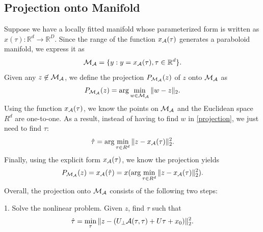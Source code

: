 \documentclass{article}
\theoremstyle{remark}
\begin{document}
\subsection{Projection onto Manifold}
Suppose we have a locally fitted manifold whose parameterized form is written as $x(\tau): {\mathbb R}^d\rightarrow {\mathbb R}^D$.
Since the range of the function $x_{\cal A}(\tau)$ generates a paraboloid manifold, we express it as 
\[
{\cal M}_{\cal A} = \{y: y = x_{\cal A}(\tau), \tau\in {\mathbb R}^d\}.
\]
Given any $z\not\in{\cal M}_{\cal A}$, we define the projection $P_{{\cal M}_{\cal A}}(z)$  of $z$ onto ${\cal M}_{\cal A}$ as
\begin{equation}\label{projection}
P_{{\cal M}_{\cal A}}(z) = \arg\min_{w \in {\cal M}_{\cal A} }\|w-z\|_2.
\end{equation}
Using the function $x_{\cal A}(\tau)$, we know the points on ${\cal M}_{\cal A}$ and the Euclidean space $R^d$ are one-to-one. As a result, instead of having to find $w$ in \eqref{projection}, we just need to find $\tau$:
\begin{equation}\label{projection_tau}
 \hat{\tau} = \arg\min_{\tau\in R^d }\|z-x_{\cal A}(\tau)\|_2^2.
\end{equation}
Finally, using the explicit form $x_{\cal A}(\tau)$, we know the projection yields
\[
P_{{\cal M}_{\cal A}}(z) = x_{\cal A}(\hat{\tau})=x(\arg\min_{\tau\in R^d }\|z-x_{\cal A}(\tau)\|_2^2).
\]
Overall, the projection onto ${\cal M}_{\cal A}$ consists of the following two steps:

1. Solve the nonlinear problem. Given $z$, find $\tau$ such that  
\begin{equation}\label{nonlinear_projection}
\hat{\tau} = \min_\tau \|z -  (U_{\perp} {\cal A} (\tau,\tau) + U \tau +x_0)\|_2^2.
\end{equation}
\end{document}
